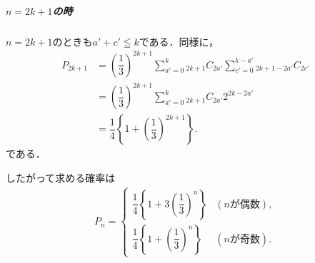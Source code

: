 \documentclass[../../main.tex]{subfiles}
\begin{document}
\subparagraph{$n=2k+1$の時}

$n=2k+1$のときも$a'+c'\leqq k$である．同様に，
\begin{align}
  P_{2k+1}
  &=\left(\dfrac{1}{3}\right)^{2k+1}
  \sum_{a'=0}^{k}{}_{2k+1}C_{2a'}
  \sum_{c'=0}^{k-a'}{}_{2k+1-2a'}C_{2c'}\\
  &=\left(\dfrac{1}{3}\right)^{2k+1}
  \sum_{a'=0}^{k}{}_{2k+1}C_{2a'}2^{2k-2a'}\\
  &=\dfrac{1}{4}\left\{1+\left(\dfrac{1}{3}\right)^{2k+1}\right\}.
\end{align}
である．
\casesend

したがって求める確率は
\begin{align}
  P_n=
  \begin{cases}
    \dfrac{1}{4}\left\{1+3\left(\dfrac{1}{3}\right)^n\right\}&(n\text{が偶数}),\\
    \dfrac{1}{4}\left\{1+\left(\dfrac{1}{3}\right)^n\right\}&(n\text{が奇数}).
  \end{cases}
\end{align}
\end{document}
